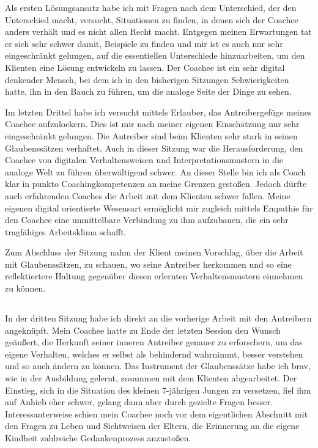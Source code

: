 \documentclass[11pt,a4paper]{article}
\begin{document}
Als ersten Lösungsansatz habe ich mit Fragen nach dem Unterschied, der den Unterschied macht, versucht, Situationen zu finden, in denen sich der Coachee anders verhält und es nicht allen Recht macht. Entgegen meinen Erwartungen tat er sich sehr schwer damit, Beispiele zu finden und mir ist es auch nur sehr eingeschränkt gelungen, auf die essentiellen Unterschiede hinzuarbeiten, um den Klienten eine Lösung entwickeln zu lassen. Der Coachee ist ein sehr digital denkender Mensch, bei dem ich in den bisherigen Sitzungen Schwierigkeiten hatte, ihn in den Bauch zu führen, um die analoge Seite der Dinge zu sehen.

Im letzten Drittel habe ich versucht mittels Erlauber, das Antreibergefüge meines Coachee aufzulockern. Dies ist mir nach meiner eigenen Einschätzung nur sehr eingeschränkt gelungen. Die Antreiber sind beim Klienten sehr stark in seinen Glaubenssätzen verhaftet. Auch in dieser Sitzung war die Herausforderung, den Coachee von digitalen Verhaltensweisen und Interpretationsmustern in die analoge Welt zu führen überwältigend schwer. An dieser Stelle bin ich als Coach klar in punkto Coachingkompetenzen an meine Grenzen gestoßen. Jedoch dürfte auch erfahrenden Coaches die Arbeit mit dem Klienten schwer fallen. Meine eigenen digital orientierte Wesensart ermöglicht mir zugleich mittels Empathie für den Coachee eine unmittelbare Verbindung zu ihm aufzubauen, die ein sehr tragfähiges Arbeitsklima schafft.


Zum Abschluss der Sitzung nahm der Klient meinen Vorschlag, über die Arbeit mit Glaubenssätzen, zu schauen, wo seine Antreiber herkommen und so eine reflektiertere Haltung gegenüber diesen erlernten Verhaltensmustern einnehmen zu können.




\subsection*{\color{Orange}{Dritte Sitzung: Glaubenssätze}}


In der dritten Sitzung habe ich direkt an die vorherige Arbeit mit den Antreibern angeknüpft. Mein Coachee hatte zu Ende der letzten Session den Wunsch geäußert, die Herkunft seiner inneren Antreiber genauer zu erforschern, um das eigene Verhalten, welches er selbst als behindernd wahrnimmt, besser verstehen und so auch ändern zu können. Das Instrument der Glaubenssätze habe ich brav, wie in der Ausbildung gelernt, zusammen mit dem Klienten abgearbeitet. Der Einstieg, sich in die Situation des kleinen 7-jährigen Jungen zu versetzen, fiel ihm auf Anhieb eher schwer, gelang dann aber durch gezielte Fragen besser. Interessanterweise schien mein Coachee noch vor dem eigentlichen Abschnitt mit den Fragen zu Leben und Sichtweisen der Eltern, die Erinnerung an die eigene Kindheit zahlreiche Gedankenprozess anzustoßen.
\end{document}
